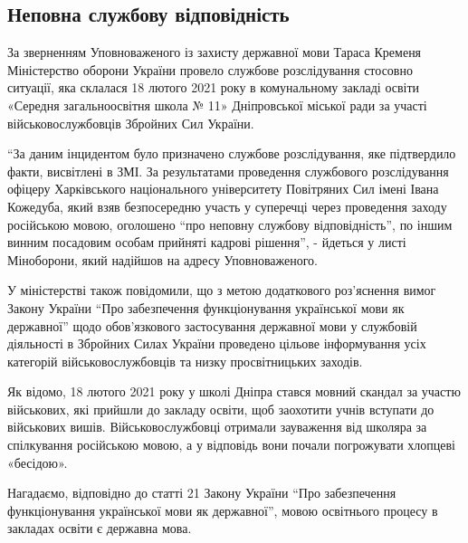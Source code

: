  
 
 
 
 

\subsection{Неповна службову відповідність}
\label{sec:08_04_2021.fb.promovugroup.1.mova_vsu_dnepropetrovsk}

За зверненням Уповноваженого із захисту державної мови Тараса Кременя
Міністерство оборони України провело службове розслідування стосовно ситуації,
яка склалася 18 лютого 2021 року в комунальному закладі освіти «Середня
загальноосвітня школа № 11» Дніпровської міської ради за участі
військовослужбовців Збройних Сил України.

“За даним інцидентом було призначено службове розслідування, яке підтвердило
факти, висвітлені в ЗМІ. За результатами проведення службового розслідування
офіцеру Харківського національного університету Повітряних Сил імені Івана
Кожедуба, який взяв безпосередню участь у суперечці через проведення заходу
російською мовою, оголошено “про неповну службову відповідність”, по іншим
винним посадовим особам прийняті кадрові рішення”, - йдеться у листі
Міноборони, який надійшов на адресу Уповноваженого.

У міністерстві також повідомили, що з метою додаткового роз'яснення вимог
Закону України “Про забезпечення функціонування української мови як державної”
щодо обов'язкового застосування державної мови у службовій діяльності в
Збройних Силах України проведено цільове інформування усіх категорій
військовослужбовців та низку просвітницьких заходів. 

Як відомо, 18 лютого 2021 року у школі Дніпра стався мовний скандал за участю
військових, які прийшли до закладу освіти, щоб заохотити учнів вступати до
військових вишів. Військовослужбовці отримали зауваження від школяра за
спілкування російською мовою, а у відповідь вони почали погрожувати хлопцеві
«бесідою».

Нагадаємо, відповідно до статті 21 Закону України “Про забезпечення
функціонування української мови як державної”, мовою освітнього процесу в
закладах освіти є державна мова.

